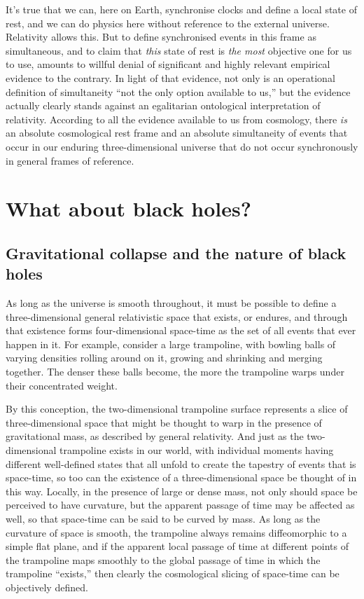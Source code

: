 \documentclass[aps,rmp,groupedaddress,twocolumn,10pt]{revtex4-2}
\begin{document}
It's true that we can, here on Earth, synchronise clocks and define a local state of rest, and we can do physics here without reference to the external universe. Relativity allows this. But to define synchronised events in this frame as simultaneous, and to claim that \textit{this} state of rest is \textit{the most} objective one for us to use, amounts to willful denial of significant and highly relevant empirical evidence to the contrary. In light of that evidence, not only is an operational definition of simultaneity ``not the only option available to us,'' but the evidence actually clearly stands against an egalitarian ontological interpretation of relativity. According to all the evidence available to us from cosmology, there \textit{is} an absolute cosmological rest frame and an absolute simultaneity of events that occur in our enduring three-dimensional universe that do not occur synchronously in general frames of reference. 

\section{What about black holes?}\label{sec:BH}

\subsection{Gravitational collapse and the nature of black holes}

As long as the universe is smooth throughout, it must be possible to define a three-dimensional general relativistic space that exists, or endures, and through that existence forms four-dimensional space-time as the set of all events that ever happen in it. For example, consider a large trampoline, with bowling balls of varying densities rolling around on it, growing and shrinking and merging together. The denser these balls become, the more the trampoline warps under their concentrated weight. 

By this conception, the two-dimensional trampoline surface represents a slice of three-dimensional space that might be thought to warp in the presence of gravitational mass, as described by general relativity. And just as the two-dimensional trampoline exists in our world, with individual moments having different well-defined states that all unfold to create the tapestry of events that is space-time, so too can the existence of a three-dimensional space be thought of in this way. Locally, in the presence of large or dense mass, not only should space be perceived to have curvature, but the apparent passage of time may be affected as well, so that space-time can be said to be curved by mass. As long as the curvature of space is smooth, the trampoline always remains diffeomorphic to a simple flat plane, and if the apparent local passage of time at different points of the trampoline maps smoothly to the global passage of time in which the trampoline ``exists,'' then clearly the cosmological slicing of space-time can be objectively defined.
\end{document}
